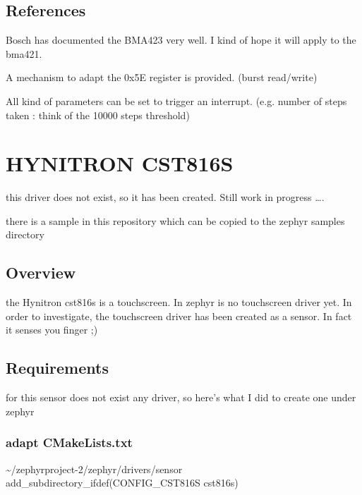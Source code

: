 \documentclass[letterpaper,10pt,english]{sphinxmanual}
\begin{document}
\subsection{References}
\label{\detokenize{drivers/bma421:references}}
Bosch has documented the BMA423 very well.
I kind of hope it will apply to the bma421.

A mechanism to adapt the 0x5E register is provided.
(burst read/write)

All kind of parameters can be set to trigger an interrupt.
(e.g. number of steps taken : think of the 10000 steps threshold)


\section{HYNITRON CST816S}
\label{\detokenize{drivers/cst816s:hynitron-cst816s}}\label{\detokenize{drivers/cst816s::doc}}
this driver does not exist, so it has been created.
Still work in progress ….

there is a sample in this repository which can be copied to the zephyr samples directory

\begin{sphinxVerbatim}[commandchars=\\\{\}]
\end{sphinxVerbatim}


\subsection{Overview}
\label{\detokenize{drivers/cst816s:overview}}
the Hynitron cst816s is a touchscreen.
In zephyr is no touchscreen driver yet.
In order to investigate, the touchscreen driver has been created as a sensor.
In fact it senses you finger ;)


\subsection{Requirements}
\label{\detokenize{drivers/cst816s:requirements}}
for this sensor does not exist any driver, so here’s what I did to create one under zephyr


\subsubsection{adapt CMakeLists.txt}
\label{\detokenize{drivers/cst816s:adapt-cmakelists-txt}}
\textasciitilde{}/zephyrproject-2/zephyr/drivers/sensor
add\_subdirectory\_ifdef(CONFIG\_CST816S           cst816s)
\end{document}
